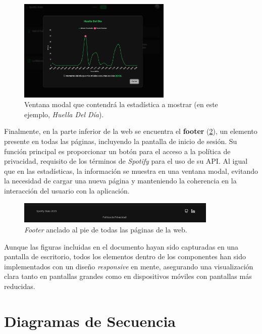 \begin{figure}[H]
    \centering
    \includegraphics[width=0.65\textwidth]{figures/capturas_ui/modal.png}
    \caption{Ventana modal que contendrá la estadística a mostrar (en este ejemplo, \textit{Huella Del Día}).}
    \label{fig:modal}
\end{figure}

Finalmente, en la parte inferior de la web se encuentra el \textbf{footer} (\ref{fig:footer}), un elemento presente en todas las páginas, incluyendo la pantalla de inicio de sesión. Su función principal es proporcionar un botón para el acceso a la política de privacidad, requisito de los términos de \textit{Spotify} para el uso de su API. Al igual que en las estadísticas, la información se muestra en una ventana modal, evitando la necesidad de cargar una nueva página y manteniendo la coherencia en la interacción del usuario con la aplicación.

\begin{figure}[H]
    \centering
    \includegraphics[width=0.85\textwidth]{figures/capturas_ui/footer.png}
    \caption{\textit{Footer} anclado al pie de todas las páginas de la web.}
    \label{fig:footer}
\end{figure}

Aunque las figuras incluidas en el documento hayan sido capturadas en una pantalla de escritorio, todos los elementos dentro de los componentes han sido implementados con un diseño \textit{responsive} en mente, asegurando una visualización clara tanto en pantallas grandes como en dispositivos móviles con pantallas más reducidas.

\newpage

\section{Diagramas de Secuencia}

